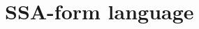 \documentclass[a4paper,11pt]{article}
\begin{document}
%
%
%
\clearpage

\section{SSA-form language  }
\end{document}
